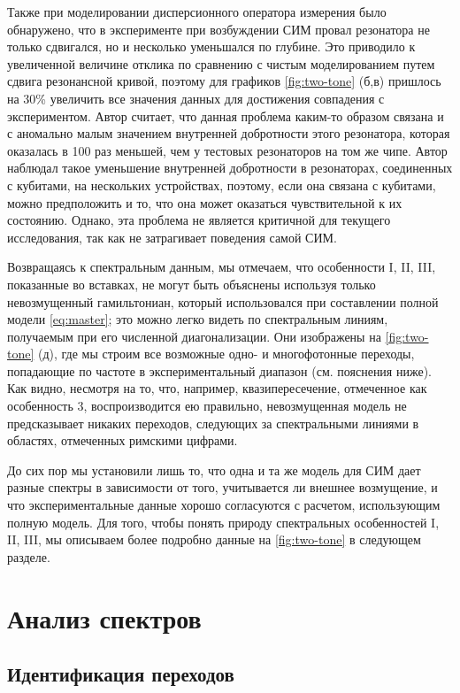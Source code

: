 \documentclass[14pt, a4paper]{extreport}
\numberwithin{equation}{section}
\begin{document}
Также при моделировании дисперсионного оператора измерения было обнаружено, что в эксперименте при возбуждении СИМ провал резонатора не только сдвигался, но и несколько уменьшался по глубине. Это приводило к увеличенной величине отклика по сравнению с чистым моделированием путем сдвига резонансной кривой, поэтому для графиков \autoref{fig:two-tone} (б,в) пришлось на 30\% увеличить все значения данных для достижения совпадения с экспериментом. Автор считает, что данная проблема каким-то образом связана и с аномально малым значением внутренней добротности этого резонатора, которая оказалась в 100 раз меньшей, чем у тестовых резонаторов на том же чипе. Автор наблюдал такое уменьшение внутренней добротности в резонаторах, соединенных с кубитами, на нескольких устройствах, поэтому, если она связана с кубитами, можно предположить и то, что она может оказаться чувствительной к их состоянию. Однако, эта проблема не является критичной для текущего исследования, так как не затрагивает поведения самой СИМ.

Возвращаясь к спектральным данным, мы отмечаем, что особенности I, II, III, показанные во вставках, не могут быть объяснены используя только невозмущенный гамильтониан, который использовался при составлении полной модели \eqref{eq:master}; это можно легко видеть по спектральным линиям, получаемым при его численной диагонализации. Они изображены на \autoref{fig:two-tone} (д), где мы строим все возможные одно- и многофотонные переходы, попадающие по частоте в экспериментальный диапазон (см. пояснения ниже). Как видно, несмотря на то, что, например, квазипересечение, отмеченное как особенность 3, воспроизводится ею правильно, невозмущенная модель не предсказывает никаких переходов, следующих за спектральными линиями в областях, отмеченных римскими цифрами.

До сих пор мы установили лишь то, что одна и та же модель для СИМ дает разные спектры в зависимости от того, учитывается ли внешнее возмущение, и что экспериментальные данные хорошо согласуются с расчетом, использующим полную модель. Для того, чтобы понять природу спектральных особенностей I, II, III, мы описываем более подробно данные на \autoref{fig:two-tone} в следующем разделе.

\section{Анализ спектров}

\subsection{Идентификация переходов}
\end{document}
